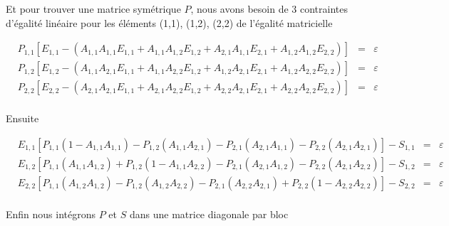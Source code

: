 Et pour trouver une matrice symétrique $P$, nous avons besoin de 3 contraintes d'égalité linéaire pour les éléments (1,1), (1,2), (2,2) de l'égalité matricielle 

 \begin{equation}
 \begin{array}{rrcl}
 
&P_{1,1} \left[ E_{1,1} - \left( A_{1,1} A_{1,1} E_{1,1}+ A_{1,1} A_{1,2} E_{1,2}+A_{2,1} A_{1,1} E_{2,1} +A_{1,2} A_{1,2} E_{2,2}       \right) \right] &=&\varepsilon \\

&P_{1,2} \left[ E_{1,2} - \left( A_{1,1} A_{2,1} E_{1,1}+ A_{1,1} A_{2,2} E_{1,2}+A_{1,2} A_{2,1} E_{2,1} +A_{1,2} A_{2,2} E_{2,2}       \right) \right] &=&\varepsilon \\

&P_{2,2} \left[ E_{2,2} - \left( A_{2,1} A_{2,1} E_{1,1}+A_{2,1} A_{2,2} E_{1,2} +A_{2,2} A_{2,1} E_{2,1} + A_{2,2} A_{2,2} E_{2,2}      \right) \right] &=&\varepsilon \\

\end{array}
 \end{equation}
 
 Ensuite
 
   \begin{equation}
 \begin{array}{rrcl}
 
&E_{1,1} \left[ P_{1,1} \left(1-  A_{1,1} A_{1,1}\right)- P_{1,2} \left(  A_{1,1} A_{2,1}\right) -P_{2,1} \left( A_{2,1} A_{1,1}\right) -P_{2,2} \left(A_{2,1} A_{2,1}\right)       \right]-S_{1,1} &=&\varepsilon \\

&E_{1,2} \left[ P_{1,1} \left( A_{1,1} A_{1,2}\right)+ P_{1,2} \left( 1- A_{1,1} A_{2,2}\right) -P_{2,1} \left( A_{2,1} A_{1,2}\right) -P_{2,2} \left( A_{2,1} A_{2,2}\right)       \right]-S_{1,2} &=&\varepsilon \\


&E_{2,2} \left[ P_{1,1} \left( A_{1,2} A_{1,2}\right)- P_{1,2} \left(  A_{1,2} A_{2,2}\right) -P_{2,1} \left( A_{2,2} A_{2,1}\right) +P_{2,2} \left(1-  A_{2,2} A_{2,2}\right)       \right]-S_{2,2} &=&\varepsilon \\


\end{array}
 \end{equation}
 
 
  Enfin nous intégrons $P$ et $S$ dans une matrice diagonale par bloc 
 
